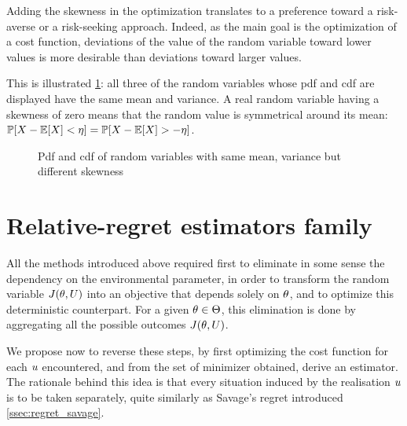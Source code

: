 \documentclass[../../Main_ManuscritThese.tex]{subfiles}
\newcommand\imgpath{/home/victor/acadwriting/Manuscrit/Text/Chapter3/img/}
\begin{document}
Adding the skewness in the optimization translates to a preference toward a risk-averse or a risk-seeking approach. Indeed, as the main goal is the optimization of a cost function, deviations of the value of the random variable toward lower values is more desirable than deviations toward larger values.

This is illustrated \cref{fig:skewness_example}: all three of the random variables whose pdf and cdf are displayed have the same mean and variance. A real random variable having a skewness of zero means that the random value is symmetrical around its mean: $\mathbb{P}[X - \mathbb{E}[X] < \eta] = \mathbb{P}[X - \mathbb{E}[X] > - \eta]$.


\begin{figure}[ht]
  \centering
  
  \caption{\label{fig:skewness_example} Pdf and cdf of random variables with same mean, variance but different skewness}
\end{figure}


\section{Relative-regret estimators family}
\label{sec:rr_family}
All the methods introduced above required first to eliminate in some sense the dependency on the environmental parameter, in order to transform the random variable $J(\theta, U)$ into an objective that depends solely on $\theta$, and to optimize this deterministic counterpart.
For a given $\theta\in\Theta$, this elimination is done by aggregating all the possible outcomes $J(\theta, U)$.


We propose now to reverse these steps, by first optimizing the cost function for each $u$ encountered, and from the set of minimizer obtained, derive an estimator. The rationale behind this idea is that every situation induced by the realisation $u$ is to be taken separately, quite similarly as Savage's regret introduced \cref{ssec:regret_savage}.
\end{document}
